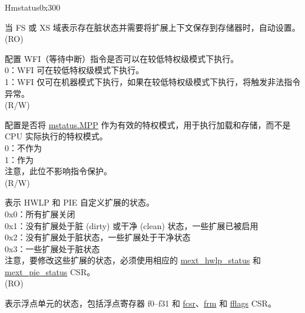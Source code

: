 \begin{register}{H}{mstatus}{0x300}\label{regdesc:MSTATUS}
%
%
%
%
%
%
%
%
%
%
%
%
%
%
%
\regnewline%
\begin{regdesc}\begin{reglist}
\label{fielddesc:MSTATUS_SD}\item [SD] 当 FS 或 XS 域表示存在脏状态并需要将扩展上下文保存到存储器时，自动设置。(RO)
\label{fielddesc:MSTATUSTW}\item [TW] 配置 WFI（等待中断）指令是否可以在较低特权级模式下执行。\\
0：WFI 可在较低特权级模式下执行。\\
1：WFI 仅可在机器模式下执行，如果在较低特权级模式下执行，将触发非法指令异常。\\
(R/W)
\label{fielddesc:MSTATUS_MPRV}\item [MPRV] 配置是否将 \hyperref[fielddesc:MSTATUSMPP]{mstatus.MPP} 作为有效的特权模式，用于执行加载和存储，而不是 CPU 实际执行的特权模式。\\
0：不作为\\
1：作为\\
注意，此位不影响指令保护。\\
(R/W) \\
\label{fielddesc:MSTATUS_XS}\item [XS] 表示 HWLP 和 PIE 自定义扩展的状态。\\
0x0：所有扩展关闭\\
0x1：没有扩展处于脏 (dirty) 或干净 (clean) 状态，一些扩展已被启用\\
0x2：没有扩展处于脏状态，一些扩展处于干净状态\\
0x3：一些扩展处于脏状态\\
注意，要修改这些扩展的状态，必须使用相应的 \hyperref[regdesc:MEXT_HWLP_STATUS]{mext\_hwlp\_status} 和 \hyperref[regdesc:MEXT_PIE_STATUS]{mext\_pie\_status} CSR。\\
(RO) \\
\label{fielddesc:MSTATUS_FS}\item [FS] 表示浮点单元的状态，包括浮点寄存器 f0–f31 和 \hyperref[regdesc:FCSR]{fcsr}、\hyperref[regdesc:FCSR]{frm} 和 \hyperref[regdesc:FFLAGS]{fflags} CSR。\\

\end{reglist}
\end{regdesc}
\end{register}

